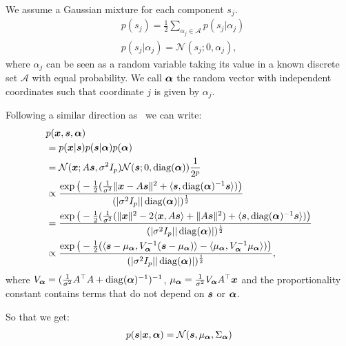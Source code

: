 We assume a Gaussian mixture for each component $s_j$.
\begin{align}
  &p(s_j) = \frac12 \sum_{\alpha_j \in \mathcal{A}} p(s_j | \alpha_j) \\
  &p(s_j | \alpha_j) = \mathcal{N}( s_j; 0, \alpha_j),
\end{align}
where $\alpha_j$ can be seen as a random variable taking its value in a known
discrete set $\mathcal{A}$ with equal probability. We call $\boldsymbol{\alpha}$ the random vector with
independent coordinates such that coordinate $j$ is given by $\alpha_j$.

Following a similar direction as~\cite{moulines1997maximum} we can write:
\begin{align}
  &p(\boldsymbol{x}, \boldsymbol{s}, \boldsymbol{\alpha}) \\
  &= p(\boldsymbol{x} | \boldsymbol{s}) p(\boldsymbol{s}|\boldsymbol{\alpha})p(\boldsymbol{\alpha}) \\
                        &= \mathcal{N}(\boldsymbol{x}; A\boldsymbol{s}, \sigma^2 I_p)\mathcal{N}( \boldsymbol{s}; 0, \operatorname*{diag}(\boldsymbol{\alpha})) \frac1{2^p} \\
  &\propto \frac{\exp\big(-\frac12(\frac1{ \sigma^2}\|\boldsymbol{x} - A\boldsymbol{s} \|^2 + \langle \boldsymbol{s} , \operatorname*{diag}(\boldsymbol{\alpha})^{-1} \boldsymbol{s}\rangle)\big)}{(|\sigma^2 I_p| |\operatorname*{diag}(\boldsymbol{\alpha})|)^{\frac12}}  \\
  &= \frac{\exp\big(-\frac12(\frac1{ \sigma^2}(\|\boldsymbol{x} \|^2 - 2 \langle \boldsymbol{x}, A \boldsymbol{s} \rangle + \|A \boldsymbol{s} \|^2)  + \langle \boldsymbol{s} , \operatorname*{diag}(\boldsymbol{\alpha})^{-1} \boldsymbol{s}\rangle) \big)}{(|\sigma^2 I_p| |\operatorname*{diag}(\boldsymbol{\alpha})|)^{\frac12}} \\
  &\propto \frac{\exp\big(-\frac12( \langle \boldsymbol{s} - \mu_{\boldsymbol{\alpha}}, V_{\boldsymbol{\alpha}}^{-1} (\boldsymbol{s} - \mu_{\boldsymbol{\alpha}}) \rangle - \langle \mu_{\boldsymbol{\alpha}} ,V_{\boldsymbol{\alpha}}^{-1} \mu_{\boldsymbol{\alpha}} \rangle) \big)}{(|\sigma^2 I_p| |\operatorname*{diag}(\boldsymbol{\alpha})|)^{\frac12}},
\end{align}
where $V_{\boldsymbol{\alpha}} = (\frac1{\sigma^2}A^{\top}A + \operatorname*{diag}(\boldsymbol{\alpha})^{-1})^{-1}$, $\mu_{\boldsymbol{\alpha}} = \frac1{\sigma^2}V_{\boldsymbol{\alpha}}
A^{\top} \boldsymbol{x}$ and the proportionality constant contains terms that do not depend
on $\boldsymbol{s}$ or $\boldsymbol{\alpha}$.

So that we get:
\begin{align}
  p(\boldsymbol{s} | \boldsymbol{x}, \boldsymbol{\alpha}) =  \mathcal{N}(\boldsymbol{s}, \mu_{\boldsymbol{\alpha}}, \Sigma_{\boldsymbol{\alpha}})
\end{align}

